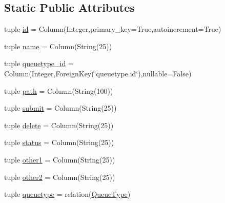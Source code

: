\subsection*{\-Static \-Public \-Attributes}
\begin{DoxyCompactItemize}
\item 
tuple \hyperlink{classcyberweb_1_1model_1_1queue_1_1_queue_system_adae76655e755e023898883754c0ccbe1}{id} = \-Column(\-Integer,primary\-\_\-key=\-True,autoincrement=\-True)
\item 
tuple \hyperlink{classcyberweb_1_1model_1_1queue_1_1_queue_system_aa9816b5d0dbcb8f7df2873e3e3c66636}{name} = \-Column(\-String(25))
\item 
tuple \hyperlink{classcyberweb_1_1model_1_1queue_1_1_queue_system_ac2bd5fbdb30147bd7b26eaf4182046cd}{queuetype\-\_\-id} = \-Column(\-Integer,\-Foreign\-Key(\char`\"{}queuetype.\-id\char`\"{}),nullable=\-False)
\item 
tuple \hyperlink{classcyberweb_1_1model_1_1queue_1_1_queue_system_a8a8b1467e4751dd9f255a0da6e9f06e3}{path} = \-Column(\-String(100))
\item 
tuple \hyperlink{classcyberweb_1_1model_1_1queue_1_1_queue_system_a1201392160b3a4b9e7d895389174a01e}{submit} = \-Column(\-String(25))
\item 
tuple \hyperlink{classcyberweb_1_1model_1_1queue_1_1_queue_system_a8e4afc9acb151ecfc98a40899c8e64db}{delete} = \-Column(\-String(25))
\item 
tuple \hyperlink{classcyberweb_1_1model_1_1queue_1_1_queue_system_a03a12c5b446e1b4914591772bf0442a7}{status} = \-Column(\-String(25))
\item 
tuple \hyperlink{classcyberweb_1_1model_1_1queue_1_1_queue_system_a6014b2de013484a50c8fb3b5dd8580ca}{other1} = \-Column(\-String(25))
\item 
tuple \hyperlink{classcyberweb_1_1model_1_1queue_1_1_queue_system_a6759054cfd880d4fb01b12086d53633a}{other2} = \-Column(\-String(25))
\item 
tuple \hyperlink{classcyberweb_1_1model_1_1queue_1_1_queue_system_aa5cdabc73ac8263a80a5cfc4e6255044}{queuetype} = relation(\hyperlink{classcyberweb_1_1model_1_1queue_1_1_queue_type}{\-Queue\-Type})
\end{DoxyCompactItemize}


